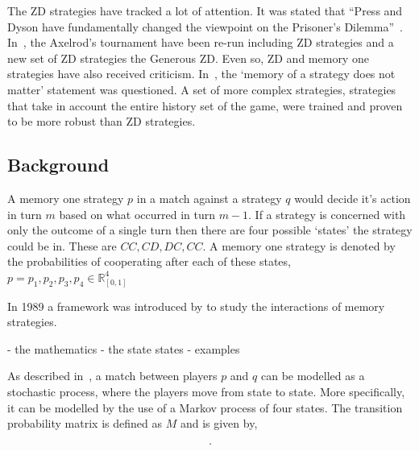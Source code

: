 \documentclass[10pt]{article}
\newcommand{\R}{\mathbb{R}}
\begin{document}
The ZD strategies have tracked a lot of attention. It was stated that
``Press and Dyson have fundamentally changed the viewpoint on the Prisoner's
Dilemma''~\cite{Stewart2012}. In~\cite{Stewart2012}, the Axelrod's
tournament have been re-run including ZD strategies and a new set of ZD
strategies the Generous ZD. Even so, ZD and memory one strategies have
also received criticism. In~\cite{Harper2015}, the `memory of a strategy does
not matter' statement was questioned. A set of more complex strategies,
strategies that take in account the entire history set of the game, were
trained and proven to be more robust than ZD strategies.

\subsection{Background}

A memory one strategy \(p\) in a match against a strategy \(q\) would decide it's
action in turn \(m\) based on what occurred in turn \(m - 1\). If a strategy is concerned with only the outcome
of a single turn then there are four possible `states' the strategy could be in.
These are \(CC, CD, DC,CC\). A memory one strategy is denoted by the probabilities
of cooperating after each of these states, \(p=p_1, p_2, p_3, p_4 \in \R_{[0,1]} ^ 4\) 

\begin{figure}
    \centering
    \begin{subfigure}{0.45\textwidth}
        
    \end{subfigure}
    \begin{subfigure}{0.45\textwidth}
        
    \end{subfigure}
\end{figure}

In 1989 a framework was introduced by to study the interactions of memory
strategies.

- the mathematics
- the state states 
- examples

As described in~\cite{Nowak1990}, a match between players \(p\) and \(q\)
can be modelled as a stochastic process, where the players move from state to 
state. More specifically, it can be modelled by the use of a Markov process of
four states. The transition probability matrix is defined as \(M\) and is given
by,

\begin{equation}\label{eq:m_matrix}
    .
\end{equation}
\end{document}
